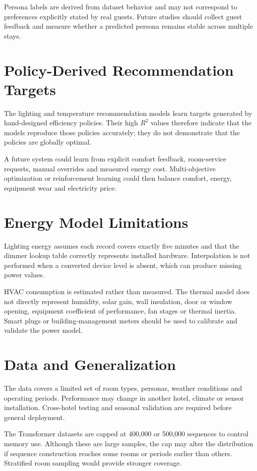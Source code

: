 Persona labels are derived from dataset behavior and may not correspond to
preferences explicitly stated by real guests. Future studies should collect
guest feedback and measure whether a predicted persona remains stable across
multiple stays.

\section{Policy-Derived Recommendation Targets}

The lighting and temperature recommendation models learn targets generated by
hand-designed efficiency policies. Their high $R^2$ values therefore indicate
that the models reproduce those policies accurately; they do not demonstrate
that the policies are globally optimal.

A future system could learn from explicit comfort feedback, room-service
requests, manual overrides and measured energy cost. Multi-objective
optimization or reinforcement learning could then balance comfort, energy,
equipment wear and electricity price.

\section{Energy Model Limitations}

Lighting energy assumes each record covers exactly five minutes and that the
dimmer lookup table correctly represents installed hardware. Interpolation is
not performed when a converted device level is absent, which can produce
missing power values.

HVAC consumption is estimated rather than measured. The thermal model does not
directly represent humidity, solar gain, wall insulation, door or window
opening, equipment coefficient of performance, fan stages or thermal inertia.
Smart plugs or building-management meters should be used to calibrate and
validate the power model.

\section{Data and Generalization}

The data covers a limited set of room types, personas, weather conditions and
operating periods. Performance may change in another hotel, climate or sensor
installation. Cross-hotel testing and seasonal validation are required before
general deployment.

The Transformer datasets are capped at 400,000 or 500,000 sequences to control
memory use. Although these are large samples, the cap may alter the
distribution if sequence construction reaches some rooms or periods earlier
than others. Stratified room sampling would provide stronger coverage.

